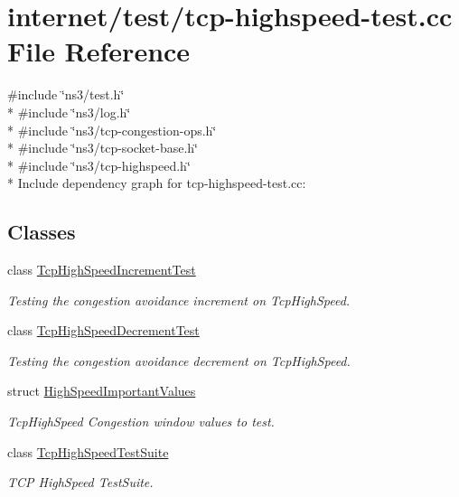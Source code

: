 \hypertarget{tcp-highspeed-test_8cc}{}\section{internet/test/tcp-\/highspeed-\/test.cc File Reference}
\label{tcp-highspeed-test_8cc}
{\ttfamily \#include \char`\"{}ns3/test.\+h\char`\"{}}\\*
{\ttfamily \#include \char`\"{}ns3/log.\+h\char`\"{}}\\*
{\ttfamily \#include \char`\"{}ns3/tcp-\/congestion-\/ops.\+h\char`\"{}}\\*
{\ttfamily \#include \char`\"{}ns3/tcp-\/socket-\/base.\+h\char`\"{}}\\*
{\ttfamily \#include \char`\"{}ns3/tcp-\/highspeed.\+h\char`\"{}}\\*
Include dependency graph for tcp-\/highspeed-\/test.cc\+:
\subsection*{Classes}
\begin{DoxyCompactItemize}
\item 
class \hyperlink{classTcpHighSpeedIncrementTest}{Tcp\+High\+Speed\+Increment\+Test}
\begin{DoxyCompactList}\small\item\em Testing the congestion avoidance increment on Tcp\+High\+Speed. \end{DoxyCompactList}\item 
class \hyperlink{classTcpHighSpeedDecrementTest}{Tcp\+High\+Speed\+Decrement\+Test}
\begin{DoxyCompactList}\small\item\em Testing the congestion avoidance decrement on Tcp\+High\+Speed. \end{DoxyCompactList}\item 
struct \hyperlink{structHighSpeedImportantValues}{High\+Speed\+Important\+Values}
\begin{DoxyCompactList}\small\item\em Tcp\+High\+Speed Congestion window values to test. \end{DoxyCompactList}\item 
class \hyperlink{classTcpHighSpeedTestSuite}{Tcp\+High\+Speed\+Test\+Suite}
\begin{DoxyCompactList}\small\item\em T\+CP High\+Speed Test\+Suite. \end{DoxyCompactList}\end{DoxyCompactItemize}
